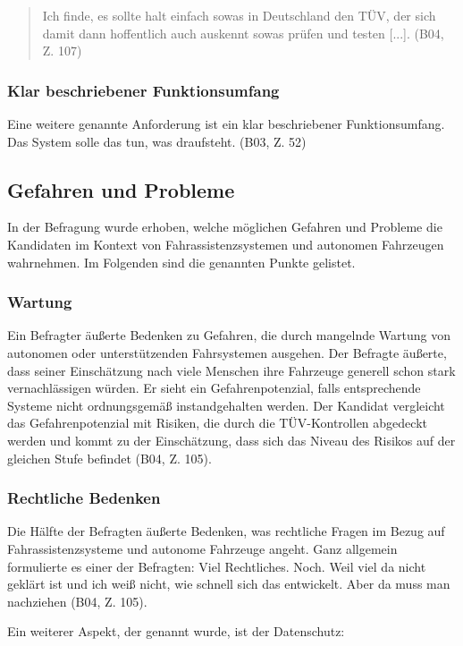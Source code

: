 \documentclass[12pt]{article}
\begin{document}
\begin{quote}
  Ich finde, es sollte halt einfach sowas in Deutschland den TÜV, der sich damit dann hoffentlich auch auskennt sowas prüfen und testen [...]. (B04, Z. 107)
\end{quote}

\subsubsection*{Klar beschriebener Funktionsumfang}
Eine weitere genannte Anforderung ist ein klar beschriebener Funktionsumfang. Das System solle \glqq das tun, was draufsteht\grqq{}. (B03, Z. 52)


\subsection{Gefahren und Probleme}
In der Befragung wurde erhoben, welche möglichen Gefahren und Probleme die Kandidaten im Kontext von Fahrassistenzsystemen und autonomen Fahrzeugen wahrnehmen. Im Folgenden sind die genannten Punkte gelistet.

\subsubsection*{Wartung}
Ein Befragter äußerte Bedenken zu Gefahren, die durch mangelnde Wartung von autonomen oder unterstützenden Fahrsystemen ausgehen. Der Befragte äußerte, dass seiner Einschätzung nach viele Menschen ihre Fahrzeuge generell schon stark vernachlässigen würden. Er sieht ein Gefahrenpotenzial, falls entsprechende Systeme nicht ordnungsgemäß instandgehalten werden. Der Kandidat vergleicht das Gefahrenpotenzial mit Risiken, die durch die TÜV-Kontrollen abgedeckt werden und kommt zu der Einschätzung, dass sich das Niveau des Risikos auf der gleichen Stufe befindet (B04, Z. 105).

\subsubsection*{Rechtliche Bedenken}
Die Hälfte der Befragten äußerte Bedenken, was rechtliche Fragen im Bezug auf Fahrassistenzsysteme und autonome Fahrzeuge angeht. Ganz allgemein formulierte es einer der Befragten: \glqq Viel Rechtliches. Noch. Weil viel da nicht geklärt ist und ich weiß nicht, wie schnell sich das entwickelt. Aber da muss man nachziehen\grqq{} (B04, Z. 105).

Ein weiterer Aspekt, der genannt wurde, ist der Datenschutz:
\end{document}
